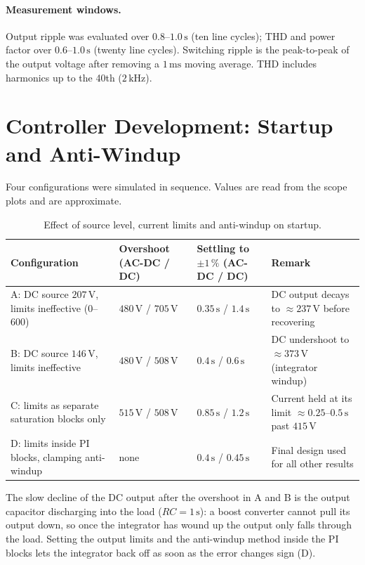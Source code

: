 \documentclass[11pt,a4paper]{article}
\begin{document}
\paragraph{Measurement windows.} Output ripple was evaluated over $0.8$--$1.0\,\mathrm{s}$
(ten line cycles); THD and power factor over $0.6$--$1.0\,\mathrm{s}$ (twenty line cycles).
Switching ripple is the peak-to-peak of the output voltage after removing a $1\,\mathrm{ms}$
moving average. THD includes harmonics up to the 40th ($2\,\mathrm{kHz}$).

\section{Controller Development: Startup and Anti-Windup}
Four configurations were simulated in sequence. Values are read from the scope plots and are
approximate.

\begin{table}[htbp]
\centering
\small
\begin{tabular}{|p{3.2cm}|p{2.4cm}|p{2.6cm}|p{4.8cm}|}
\hline
Configuration & Overshoot (AC-DC / DC) & Settling to $\pm1\,\%$ (AC-DC / DC) & Remark \\ \hline
A: DC source $207\,\mathrm{V}$, limits ineffective ($0$--$600$) &
$480\,\mathrm{V}$ / $705\,\mathrm{V}$ & $0.35\,\mathrm{s}$ / $1.4\,\mathrm{s}$ &
DC output decays to $\approx237\,\mathrm{V}$ before recovering \\ \hline
B: DC source $146\,\mathrm{V}$, limits ineffective &
$480\,\mathrm{V}$ / $508\,\mathrm{V}$ & $0.4\,\mathrm{s}$ / $0.6\,\mathrm{s}$ &
DC undershoot to $\approx373\,\mathrm{V}$ (integrator windup) \\ \hline
C: limits as separate saturation blocks only &
$515\,\mathrm{V}$ / $508\,\mathrm{V}$ & $0.85\,\mathrm{s}$ / $1.2\,\mathrm{s}$ &
Current held at its limit $\approx0.25$--$0.5\,\mathrm{s}$ past $415\,\mathrm{V}$ \\ \hline
D: limits inside PI blocks, clamping anti-windup &
none & $0.4\,\mathrm{s}$ / $0.45\,\mathrm{s}$ &
Final design used for all other results \\ \hline
\end{tabular}
\caption{Effect of source level, current limits and anti-windup on startup.}
\end{table}

The slow decline of the DC output after the overshoot in A and B is the output capacitor
discharging into the load ($RC=1\,\mathrm{s}$): a boost converter cannot pull its output down, so
once the integrator has wound up the output only falls through the load. Setting the output
limits and the anti-windup method inside the PI blocks lets the integrator back off as soon
as the error changes sign (D).
\end{document}
